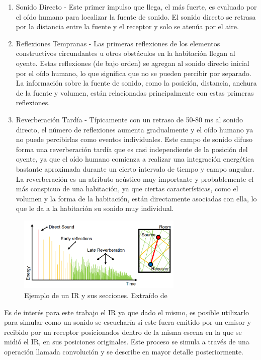 \documentclass{prgrado}
\begin{document}
\begin{enumerate}
  \item Sonido Directo - Este primer impulso que llega, el más fuerte, es evaluado por el oído humano para localizar la fuente de sonido. El sonido directo se retrasa por la distancia entre la fuente y el receptor y solo se atenúa por el aire.
  \item Reflexiones Tempranas - Las primeras reflexiones de los elementos constructivos circundantes u otros obstáculos en la habitación llegan al oyente. Estas reflexiones (de bajo orden) se agregan al sonido directo inicial por el oído humano, lo que significa que no se pueden percibir por separado. La información sobre la fuente de sonido, como la posición, distancia, anchura de la fuente y volumen, están relacionadas principalmente con estas primeras reflexiones.
  \item Reverberación Tardía - Típicamente con un retraso de 50-80 ms al sonido directo, el número de reflexiones aumenta gradualmente y el oído humano ya no puede percibirlas como eventos individuales. Este campo de sonido difuso forma una reverberación tardía que es casi independiente de la posición del oyente, ya que el oído humano comienza a realizar una integración energética bastante aproximada durante un cierto intervalo de tiempo y campo angular. La reverberación es un atributo acústico muy importante y probablemente el más conspicuo de una habitación, ya que ciertas características, como el volumen y la forma de la habitación, están directamente asociadas con ella, lo que le da a la habitación su sonido muy individual.

\end{enumerate}

\begin{figure}
    \centering
    \includegraphics[width=0.7\textwidth]{figs/ir.png}
    \captionsetup{justification=centering}
    \caption{Ejemplo de un IR y sus secciones. Extraído de \cite{Ballou}}
    \label{fig:ir_example}
\end{figure}

Es de interés para este trabajo el IR ya que dado el mismo, es posible utilizarlo para simular como un sonido se escucharía si este fuera emitido por un emisor y recibido por un receptor posicionados dentro de la misma escena en la que se midió el IR, en sus posiciones originales. Este proceso se simula a través de una operación llamada convolución y se describe en mayor detalle posteriormente.
\end{document}
